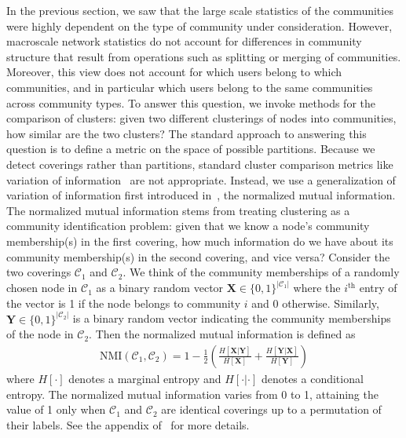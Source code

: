 In the previous section, we saw that the large scale statistics of the communities were highly dependent on the type of community under consideration. However, macroscale network statistics do not account for differences in community structure that result from operations such as splitting or merging of communities. Moreover, this view does not account for which users belong to which communities, and in particular which users belong to the same communities across community types. To answer this question, we invoke methods for the comparison of clusters: given two different clusterings of nodes into communities, how similar are the two clusters? The standard approach to answering this question is to define a metric on the space of possible partitions.  
Because we detect coverings rather than partitions, standard cluster comparison metrics like variation of information~\cite{meilua2003comparing} are not appropriate. Instead, we use a generalization of variation of information first introduced in~\cite{lancichinetti2009detecting}, the normalized mutual information. The normalized mutual information stems from treating clustering as a community identification problem: given that we know a node's community membership(s) in the first covering, how much information do we have about its community membership(s) in the second covering, and vice versa? Consider the two coverings $\mathcal{C}_{1}$ and $\mathcal{C}_{2}.$ We think of the community memberships of a randomly chosen node in $\mathcal{C}_{1}$ as a binary random vector $\mathbf{X} \in \{0, 1\}^{|\mathcal{C}_{1}|}$ where the $i^{\text{th}}$ entry of the vector is 1 if the node belongs to community $i$ and 0 otherwise. Similarly, $\mathbf{Y} \in \{ 0, 1\}^{|\mathcal{C}_{2}|}$ is a binary random vector indicating the community memberships of the node in $\mathcal{C}_{2}$. Then the normalized mutual information is defined as
\begin{align}
	\text{NMI}(\mathcal{C}_{1}, \mathcal{C}_{2}) = 1 - \frac{1}{2} \left( \frac{H[\mathbf{X} | \mathbf{Y}]}{H[\mathbf{X}]} + \frac{H[\mathbf{Y} | \mathbf{X}]}{H[\mathbf{Y}]}\right)
\end{align}
where $H[\cdot]$ denotes a marginal entropy and $H[\cdot | \cdot]$ denotes a conditional entropy. The normalized mutual information varies from 0 to 1, attaining the value of 1 only when $\mathcal{C}_{1}$ and $\mathcal{C}_{2}$ are identical coverings up to a permutation of their labels. See the appendix of~\cite{lancichinetti2009detecting} for more details.


